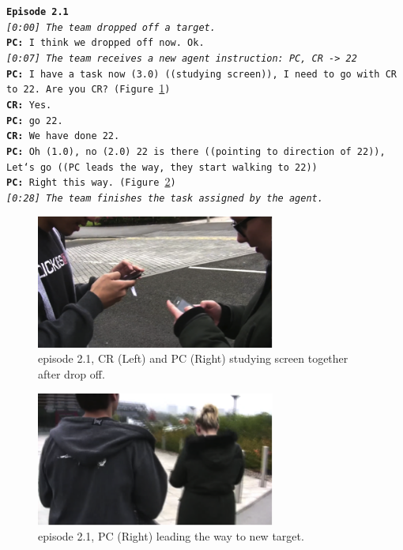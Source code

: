 \noindent\texttt{\textbf{Episode 2.1}\\
\emph{[0:00] The team dropped off a target.}\\
\textbf{PC:} I think we dropped off now. Ok. \\
\emph{ [0:07] The team receives a new agent instruction: PC, CR -> 22}\\
\textbf{PC:} I have a task now (3.0) ((studying screen)), I need to go with CR to 22. Are you CR? (Figure \ref{fig:study2ep11})\\
\textbf{CR:} Yes.\\
\textbf{PC:} go 22.\\
\textbf{CR:} We have done 22.\\
\textbf{PC:} Oh (1.0), no (2.0) 22 is there ((pointing to direction of 22)), Let`s go ((PC leads the way, they start walking to 22))\\
\textbf{PC:} Right this way. (Figure \ref{fig:study2ep12})\\
\emph{ [0:28] The team finishes the task assigned by the agent.}\\
}

\begin{figure}[ht]
\centering
 \includegraphics[width=0.7\textwidth]{img/study2/ep1/ep11}
\caption{episode 2.1, CR (Left) and PC (Right) studying screen together after drop off.}
\label{fig:study2ep11}
\end{figure}

\begin{figure}[ht]
\centering
 \includegraphics[width=0.7\textwidth]{img/study2/ep1/ep12}
\caption{episode 2.1, PC (Right) leading the way to new target.}
\label{fig:study2ep12}
\end{figure}


